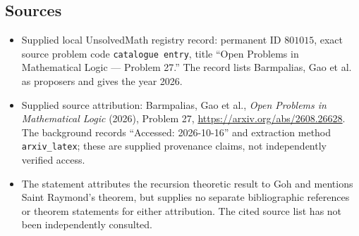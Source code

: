 \documentclass[11pt]{article}
\begin{document}
\subsection{Sources}
\begin{itemize}
\item Supplied local UnsolvedMath registry record: permanent ID \(801015\), exact source problem code \texttt{catalogue entry}, title ``Open Problems in Mathematical Logic --- Problem 27.'' The record lists Barmpalias, Gao et al. as proposers and gives the year 2026.
\item Supplied source attribution: Barmpalias, Gao et al., \emph{Open Problems in Mathematical Logic} (2026), Problem 27, \url{https://arxiv.org/abs/2608.26628}. The background records ``Accessed: 2026-10-16'' and extraction method \texttt{arxiv\_latex}; these are supplied provenance claims, not independently verified access.
\item The statement attributes the recursion theoretic result to Goh and mentions Saint Raymond's theorem, but supplies no separate bibliographic references or theorem statements for either attribution. The cited source list has not been independently consulted.
\end{itemize}
\end{document}
